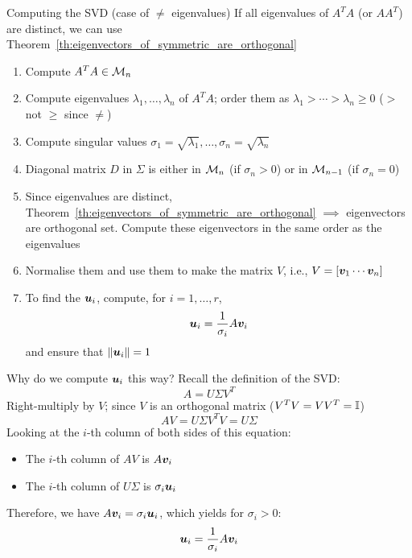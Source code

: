 \documentclass[aspectratio=169]{beamer}\usepackage[]{graphicx}\usepackage[]{xcolor}
\begin{document}
\begin{frame}{Computing the SVD (case of $\neq$ eigenvalues)}
If all eigenvalues of $A^TA$ (or $AA^T$) are distinct, we can use Theorem~\ref{th:eigenvectors_of_symmetric_are_orthogonal}
\vfill
\begin{enumerate}
\item Compute $A^TA\in\mathcal{M}_n$
\item Compute eigenvalues $\lambda_1,\ldots,\lambda_n$ of $A^TA$; order them as $\lambda_1>\cdots>\lambda_n\geq 0$ ($>$ not $\geq$ since $\neq$)
\item Compute singular values $\sigma_1=\sqrt{\lambda_1},\ldots,\sigma_n=\sqrt{\lambda_n}$
\item Diagonal matrix $D$ in $\Sigma$ is either in $\mathcal{M}_n$ (if $\sigma_n>0$) or in $\mathcal{M}_{n-1}$ (if $\sigma_n=0$)
\end{enumerate}
\end{frame}


\begin{frame}
\begin{enumerate}
\setcounter{enumi}{4}
\item Since eigenvalues are distinct, Theorem~\ref{th:eigenvectors_of_symmetric_are_orthogonal} $\implies$ eigenvectors are orthogonal set. Compute these eigenvectors in the same order as the eigenvalues
\item Normalise them and use them to make the matrix $V$, i.e., $V=[\bm{v}_1\cdots\bm{v}_n]$
\item To find the $\bm{u}_i$, compute, for $i=1,\ldots,r$,
\[
\bm{u}_i = \frac{1}{\sigma_i}A\bm{v}_i
\]
and ensure that $\|\bm{u}_i\|=1$
\end{enumerate}
\end{frame}


\begin{frame}{Why do we compute $\bm{u}_i$ this way?}
Recall the definition of the SVD:
\[
A = U\Sigma V^T
\]
Right-multiply by $V$; since $V$ is an orthogonal matrix ($V^TV = VV^T = \mathbb{I}$)
\[
AV = U\Sigma V^TV = U\Sigma
\]
Looking at the $i$-th column of both sides of this equation:
\begin{itemize}
\item The $i$-th column of $AV$ is $A\bm{v}_i$
\item The $i$-th column of $U\Sigma$ is $\sigma_i\bm{u}_i$
\end{itemize}
Therefore, we have $A\bm{v}_i = \sigma_i\bm{u}_i$, which yields for $\sigma_i > 0$:
\[
\bm{u}_i = \frac{1}{\sigma_i}A\bm{v}_i
\]
\end{frame}
\end{document}
